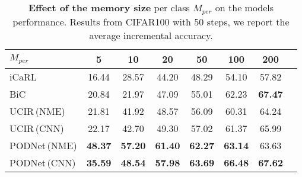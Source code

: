 \begin{table}[t]
    \centering
    \begin{tabular}{@{}lccccccc@{}}
        \toprule
        $M_{per}$                                                       & 5              & 10             & \textbf{20}    & 50             & 100            & 200            \\
        \midrule
        iCaRL \scriptsize{\citep{rebuffi2017icarl}}                     & 16.44          & 28.57          & 44.20          & 48.29          & 54.10          & 57.82          \\
        BiC \scriptsize{\citep{wu2019bias_correction}}                  & 20.84          & 21.97          & 47.09          & 55.01          & 62.23          & \textbf{67.47} \\
        UCIR\,{\scriptsize (\ac{NME})} \scriptsize{\citep{hou2019ucir}} & 21.81          & 41.92          & 48.57          & 56.09          & 60.31          & 64.24          \\
        UCIR\,{\scriptsize (CNN)}                                       & 22.17          & 42.70          & 49.30          & 57.02          & 61.37          & 65.99          \\
        PODNet\,{\scriptsize (\ac{NME})}                                & \textbf{48.37} & \textbf{57.20} & \textbf{61.40} & \textbf{62.27} & \textbf{63.14} & 63.63          \\
        PODNet\,{\scriptsize (CNN)}                                     & \textbf{35.59} & \textbf{48.54} & \textbf{57.98} & \textbf{63.69} & \textbf{66.48} & \textbf{67.62} \\
        \bottomrule
    \end{tabular}
    \caption{\textbf{Effect of the memory size} per class $M_{per}$ on the models performance.
        Results from CIFAR100 with 50 steps, we report the average incremental accuracy.}
    \label{tab:podnet_ablation_memorysize}
\end{table}
